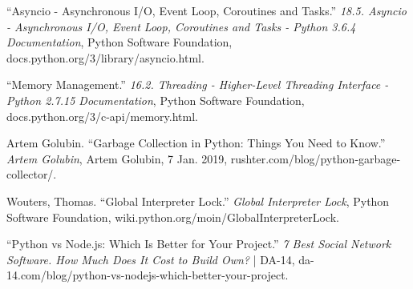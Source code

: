 \begin{thebibliography}{9}
\bibitem{} 
“Asyncio - Asynchronous I/O, Event Loop,
Coroutines and Tasks.” \textit{18.5. Asyncio -
Asynchronous I/O, Event Loop, Coroutines and Tasks
- Python 3.6.4 Documentation}, Python Software
Foundation,
docs.python.org/3/library/asyncio.html.
 
\bibitem{} 
“Memory Management.” \textit{16.2. Threading - Higher-Level Threading Interface - Python 2.7.15 Documentation}, Python Software Foundation, docs.python.org/3/c-api/memory.html.
 
\bibitem{} 
Artem Golubin. “Garbage Collection in Python: Things You Need to Know.” \textit{Artem Golubin}, Artem Golubin, 7 Jan. 2019, rushter.com/blog/python-garbage-collector/.

\bibitem{}
Wouters, Thomas. “Global Interpreter Lock.” \textit{Global Interpreter Lock}, Python Software Foundation, wiki.python.org/moin/GlobalInterpreterLock. 

\bibitem{}
“Python vs Node.js: Which Is Better for Your Project.” \textit{7 Best Social Network Software. How Much Does It Cost to Build Own?} | DA-14, da-14.com/blog/python-vs-nodejs-which-better-your-project. \\
\end{thebibliography}



